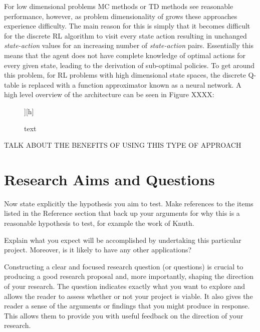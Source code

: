 \documentclass[12pt, a4paper]{article}
\begin{document}
For low dimensional problems MC methods or TD methods see reasonable performance, however, as problem dimensionality of grows these approaches experience difficulty. The main reason for this is simply that it becomes difficult for the discrete RL algorithm to visit every state action resulting in unchanged \textit{state-action} values for an increasing number of \textit{state-action} pairs. Essentially this means that the agent does not have complete knowledge of optimal actions for every given state, leading to the derivation of sub-optimal policies. To get around this problem, for RL problems with high dimensional state spaces, the discrete Q-table is replaced with a function approximator known as a neural network. A high level overview of the architecture can be seen in Figure XXXX:
\begin{figure}][h]
\centering
\caption{text}
\end{figure}



TALK ABOUT THE BENEFITS OF USING THIS TYPE OF APPROACH





\section{Research Aims and Questions}
Now state explicitly the hypothesis you aim to test. Make references to the items listed in the Reference section that back up your arguments for why this is a reasonable hypothesis to test, for example the work of Knuth.

Explain what you expect will be accomplished by undertaking this particular project.  Moreover, is it likely to have any other applications?

Constructing a clear and focused research question (or questions) is crucial to producing a good research proposal and, more importantly, shaping the direction of your research. The question indicates exactly what you want to explore and allows the reader to assess whether or not your project is viable. It also gives the reader a sense of the arguments or findings that you might produce in response. This allows them to provide you with useful feedback on the direction of your research.
\end{document}
